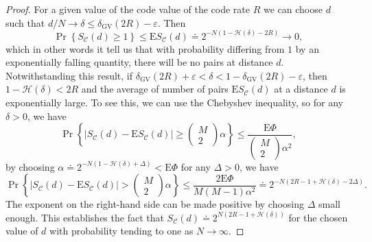 \begin{proof}
For a given value of the code value of the code rate $R$ we can choose $d$ such that $d/N\to\delta \leq \delta_{\mathrm{GV}}(2 R)-\varepsilon$. Then
\begin{equation}
\operatorname{Pr}\left\{S_{\mathcal{C}}(d) \geq 1\right\} \leq \mathrm{E} S_{\mathcal{C}}(d) \doteq 2^{-N(1-\mathcal{H}(\delta)-2 R)} \rightarrow 0,
\end{equation}
which in other words it tell us that with probability differing from $1$ by an exponentially falling quantity, there will be no pairs at distance $d$. Notwithstanding this result, if $\delta_{\mathrm{GV}}(2 R)+\varepsilon<\delta<1-\delta_{\mathrm{GV}}(2 R)-\varepsilon$, then $1-\mathcal{H}(\delta)<2R$ and the average of number of pairs $\mathrm{E} S_{\mathcal{C}}(d)$ at a distance $d$ is exponentially large. To see this, we can use the Chebyshev inequality, so for any $\delta>0$, we have 
\begin{equation}
\operatorname{Pr}\left\{\left|S_{\mathcal{C}}(d)-\mathrm{E} S_{\mathcal{C}}(d)\right| \geq\left(\begin{array}{c}
M \\
2
\end{array}\right) \alpha\right\} \leq \frac{\mathrm{E} \Phi}{\left(\begin{array}{c}
M \\
2
\end{array}\right) \alpha^{2}},
\end{equation}
by choosing $\alpha \doteq 2^{-N(1-\mathcal{H}(\delta)+\Delta)}<\mathrm{E} \Phi$ for any $\Delta>0$, we have
\begin{equation}
\operatorname{Pr}\left\{\left|S_{\mathcal{C}}(d)-\mathrm{E} S_{\mathcal{C}}(d)\right|>\left(\begin{array}{c}
M \\
2
\end{array}\right) \alpha\right\}\leq \frac{2 \mathrm{E} \Phi}{M(M-1) \alpha^{2}} \doteq 2^{-N(2 R-1+\mathcal{H}(\delta)-2 \Delta)}.
\end{equation}
The exponent on the right-hand side can be made positive by choosing $\Delta$ small enough. This establishes the fact that $S_{\mathcal{C}}(d)\doteq 2^{N(2 R-1+\mathcal{H}(\delta))}$ for the chosen value of $d$ with probability tending to one as $N\to\infty$.
\end{proof}
